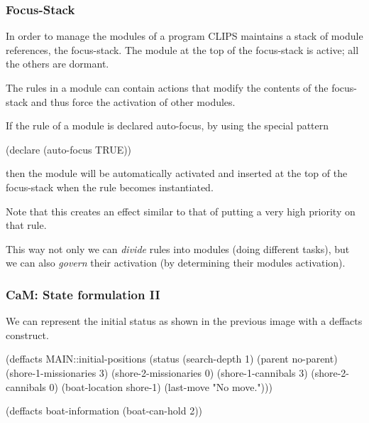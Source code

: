 \documentclass[xcolor={usenames,dvipsnames,svgnames}, compress]{beamer}
\begin{document}
\begin{frame}[fragile]
  \frametitle{Focus-Stack}
  In order to manage the modules of a program CLIPS maintains a stack
  of module references, the \textsf{focus-stack}. The module at the top of the
  focus-stack is active; all the others are dormant.\par
  The rules in a module can contain actions that modify the contents of the
  focus-stack and thus force the activation of other
  modules.\par\bigskip

  If the rule of a module is declared auto-focus, by using the special
  pattern
  \begin{clips-code}[numbers=none]
    (declare (auto-focus TRUE))
  \end{clips-code}
  then the module will be automatically activated and inserted at the top of the
  \textsf{focus-stack} when the rule becomes instantiated.\par
  Note that this creates an effect similar to that of putting a very
  high priority on that rule.\par\bigskip

  This way not only we can \emph{divide} rules into modules (doing different
  tasks), but we can also \emph{govern} their activation (by determining
  their modules activation).
\end{frame}

\begin{frame}[fragile]
  \frametitle{CaM: State formulation II}
  We can represent the initial status as shown in the previous image
  with a \textsf{deffacts} construct.
  \begin{clips-code}[numbers=none]
    (deffacts MAIN::initial-positions
         (status (search-depth 1) 
                 (parent no-parent)
                 (shore-1-missionaries 3)
                 (shore-2-missionaries 0)
                 (shore-1-cannibals 3)
                 (shore-2-cannibals 0)
                 (boat-location shore-1)
                 (last-move "No move.")))

    (deffacts boat-information
        (boat-can-hold 2))
  \end{clips-code}
\end{frame}
\end{document}
